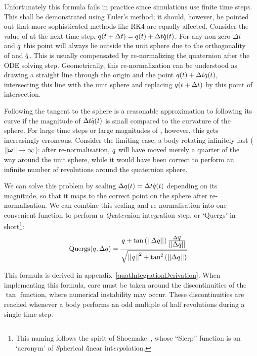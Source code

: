 Unfortunately this formula fails in practice since simulations use finite time steps. This
shall be demonstrated using Euler's method; it should, however, be pointed out that more
sophisticated methods like RK4 are equally affected. Consider the value of  at
the next time step, $\mbox{$q$}(t + \Delta t) = \mbox{$q$}(t) + \Delta t \dot{\mbox{$q$}}(t)$.
For any non-zero $\Delta t$ and $\dot{\mbox{$q$}}$ this point will always lie outside the
unit sphere due to the orthogonality of  and $\dot{\mbox{$q$}}$.
This is usually compensated by re-normalizing the quaternion after the ODE solving step.
Geometrically, this re-normalization can be understood as drawing a straight line through
the origin and the point $\mbox{$q$}(t) + \Delta t \dot{\mbox{$q$}}(t)$,
intersecting this line with the unit sphere and replacing $\mbox{$q$}(t + \Delta t)$ by this
point of intersection.

Following the tangent to the sphere is a reasonable approximation to following its curve if the
magnitude of $\Delta t \dot{\mbox{$q$}}(t)$ is small compared to the curvature of the sphere.
For large time steps or large magnitudes of \ve{\omega}, however, this gets increasingly
erroneous. Consider the limiting case, a body rotating infinitely fast
($\norm{\ve{\omega}} \rightarrow \infty$): after re-normalisation, $\mbox{$q$}$ will have moved merely
a quarter of the way around the unit sphere, while it would have been correct to perform an
infinite number of revolutions around the quaternion sphere.

We can solve this problem by scaling $\Delta\mbox{$q$}(t) = \Delta t \dot{\mbox{$q$}}(t)$
depending on its magnitude, so that it maps to the correct point on the sphere after
re-normalisation. We can combine this scaling and re-normalisation into one convenient
function to perform a \emph{Qu}at\emph{er}nion inte\emph{g}ration \emph{s}tep, or `Quergs'
in short\footnote{This naming follows the spirit of Shoemake~\cite{Shoemake:85}, whose
``Slerp'' function is an `acronym' of \emph{S}pherical \emph{l}inear int\emph{erp}olation.}:
\begin{equation}
\label{quergs}
\mathrm{Quergs}(\mbox{$q$}, \Delta\mbox{$q$}) =
    \frac{\mbox{$q$} + \tan\left(\mbox{$||\Delta\mbox{$q$}||$}\right)
        \frac{\Delta\mbox{$q$}}{\mbox{$||\Delta\mbox{$q$}||$}}}{
    \sqrt{\mbox{$||\mbox{$q$}||$}^2 + \tan^2\left(\mbox{$||\Delta\mbox{$q$}||$}\right)}}
\end{equation}

This formula is derived in appendix~\ref{quatIntegrationDerivation}.
When implementing this formula, care must be taken around the
discontinuities of the $\tan$ function, where numerical instability may occur. These
discontinuities are reached whenever a body performs an odd multiple of half
revolutions during a single time step.

